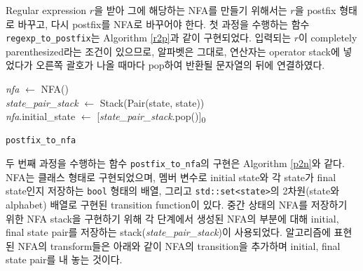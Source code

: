 \documentclass{article}
\begin{document}
\begin{multicols}{2}
Regular expression $r$을 받아 그에 해당하는 NFA를 만들기 위해서는 $r$을 postfix 형태로 바꾸고, 다시 postfix를 NFA로 바꾸어야 한다. 첫 과정을 수행하는 함수 \texttt{regexp\_to\_postfix}는 Algorithm \ref{r2p}과 같이 구현되었다. 입력되는 $r$이 completely parenthesized라는 조건이 있으므로, 알파벳은 그대로, 연산자는 operator stack에 넣었다가 오른쪽 괄호가 나올 때마다 pop하여 반환될 문자열의 뒤에 연결하였다.\\

\begin{algorithm}[H]
	\textit{nfa} $\leftarrow$ \textsf{NFA}()\\
	\textit{state\_pair\_stack} $\leftarrow$ \textsf{Stack}(\textsf{Pair}(state, state))\\
	\textit{nfa}.initial\_state $\leftarrow$ [\textit{state\_pair\_stack}\textsf{.pop}()]\textsubscript{0}\\
	\caption{\texttt{postfix\_to\_nfa}\label{p2n}}
\end{algorithm}

두 번째 과정을 수행하는 함수 \texttt{postfix\_to\_nfa}의 구현은 Algorithm \ref{p2n}와 같다. NFA는 클래스 형태로 구현되었으며, 멤버 변수로 initial state와 각 state가 final state인지 저장하는 \texttt{bool} 형태의 배열, 그리고 \texttt{std::set<state>}의 2차원(state와 alphabet) 배열로 구현된 transition function이 있다. 중간 상태의 NFA를 저장하기 위한 NFA stack을 구현하기 위해 각 단계에서 생성된 NFA의 부분에 대해 initial, final state pair를 저장하는 stack(\textit{state\_pair\_stack})이 사용되었다. 알고리즘에 표현된 NFA의 transform들은 아래와 같이 NFA의 transition을 추가하며 initial, final state pair를 내 놓는 것이다.


\end{multicols}
\end{document}
